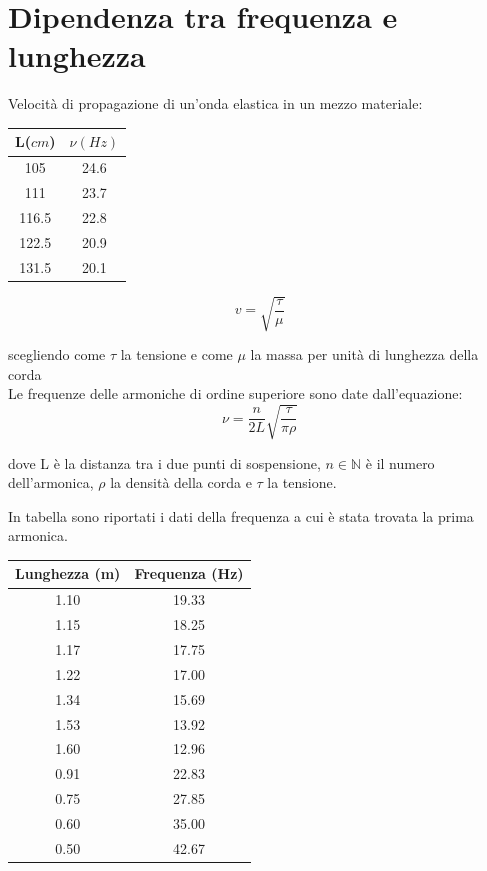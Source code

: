 \section{Dipendenza tra frequenza e lunghezza}

Velocità di propagazione di un'onda elastica in un mezzo materiale:
\begin{center}


\begin{tabular}{c|c}
L($cm$) & $\nu (Hz) $ \\
\midrule
105 & 24.6\\
111 & 23.7\\
116.5 & 22.8 \\
122.5 & 20.9 \\
131.5 & 20.1 \\
\end{tabular}
\end{center}

\begin{equation}
v=\sqrt{\frac{\tau}{\mu}}
\end{equation}

scegliendo come $\tau$ la tensione e come $\mu$ la massa per unità di lunghezza della corda\\

Le frequenze delle armoniche di ordine superiore sono date dall'equazione:
\begin{equation}
\nu=\frac{n}{2L}\sqrt{\frac{\tau}{\pi\rho}}
\end{equation}

dove L è la distanza tra i due punti di sospensione, $n\in \mathbb{N}$ è il numero dell'armonica, $\rho$ la densità della corda e $\tau$ la tensione.

In tabella sono riportati i dati della frequenza a cui è stata trovata la prima armonica.

\begin{center}
\begin{tabular}{|c|c|}
\toprule
Lunghezza (m) & Frequenza (Hz) \\
\midrule
1.10 & 19.33 \\
1.15 & 18.25 \\
1.17 & 17.75 \\
1.22 & 17.00 \\
1.34 & 15.69 \\
1.53 & 13.92 \\
1.60 & 12.96 \\
0.91 & 22.83 \\
0.75 & 27.85 \\
0.60 & 35.00 \\
0.50 & 42.67 \\
\bottomrule
\end{tabular}
\end{center}

